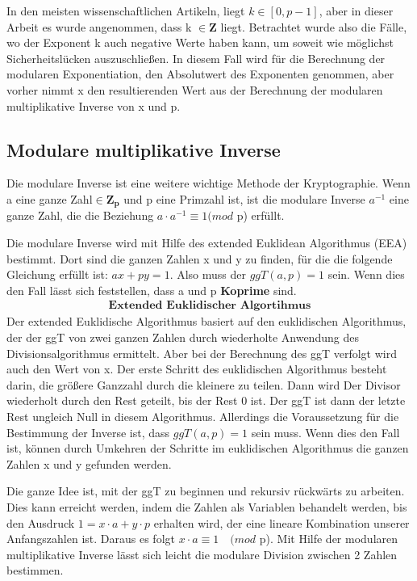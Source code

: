 In den meisten wissenschaftlichen Artikeln, liegt $ k \in [0, p-1] $, aber in dieser Arbeit es wurde angenommen, dass k $ \in \mathbf{Z}$ liegt. 
Betrachtet wurde also die Fälle, wo der Exponent k auch negative
Werte haben kann, um soweit wie möglichst Sicherheitslücken  auszuschließen. 
In diesem Fall wird für die Berechnung der modularen
Exponentiation, den Absolutwert des Exponenten genommen, aber
vorher nimmt x den
resultierenden Wert aus der Berechnung der modularen multiplikative Inverse von x und p.


\subsection{Modulare multiplikative  Inverse}

Die modulare Inverse ist eine weitere wichtige Methode der Kryptographie. Wenn a eine ganze Zahl$ \in \mathbf{Z_p} $ und p eine Primzahl ist, ist die
modulare Inverse $ a^{-1} $ eine ganze Zahl, die die Beziehung $a \cdot a^{-1} \equiv 1 ( mod $ p) erfüllt.

Die modulare Inverse wird mit Hilfe des extended Euklidean Algorithmus (EEA) bestimmt.
Dort sind die ganzen Zahlen x und y zu finden, für die die folgende Gleichung erfüllt ist: $ ax + py = 1 $. Also muss der $ ggT (a, p) = 1 $ sein. Wenn dies den Fall lässt sich feststellen, dass a und p \textbf{Koprime} sind.
\begin{align*}
    \textbf{Extended Euklidischer Algortihmus}
\end{align*}
Der extended Euklidische Algorithmus basiert auf den euklidischen Algorithmus, der der ggT von zwei ganzen Zahlen durch wiederholte Anwendung des Divisionsalgorithmus ermittelt. Aber bei der Berechnung des ggT verfolgt wird auch den Wert von x.
Der erste Schritt des euklidischen Algorithmus besteht darin, die größere Ganzzahl durch die kleinere zu teilen. Dann wird Der Divisor wiederholt durch den Rest geteilt, bis der Rest 0 ist. Der ggT ist dann der letzte Rest ungleich Null in diesem Algorithmus.
Allerdings die Voraussetzung für die Bestimmung der Inverse ist, dass $ ggT(a, p) = 1 $ sein muss. 
Wenn dies den Fall ist, können durch Umkehren der Schritte im euklidischen Algorithmus die ganzen Zahlen x und y gefunden werden.

Die ganze Idee ist, mit der ggT zu beginnen und rekursiv rückwärts zu arbeiten. Dies kann erreicht werden, indem die Zahlen als Variablen behandelt werden, bis den Ausdruck  $ 1 = x \cdot a + y \cdot p $ erhalten wird, der eine lineare Kombination unserer Anfangszahlen ist. 
Daraus es folgt $ x \cdot a \equiv 1 \quad (mod $ p).
Mit Hilfe der modularen multiplikative Inverse lässt sich leicht die modulare Division zwischen 2 Zahlen bestimmen.


